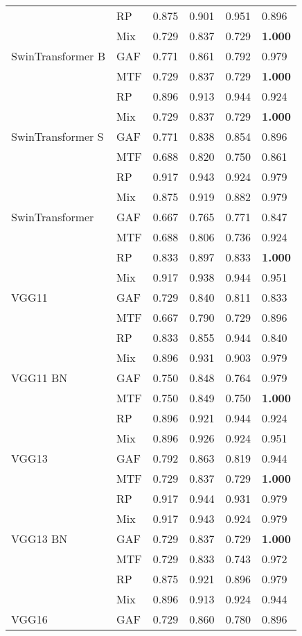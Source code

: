\begin{longtable}[t]{llllll}
 & RP & 0.875 & 0.901 & 0.951 & 0.896 \\
 & Mix & 0.729 & 0.837 & 0.729 & \textbf{1.000} \\
SwinTransformer B & GAF & 0.771 & 0.861 & 0.792 & 0.979 \\
 & MTF & 0.729 & 0.837 & 0.729 & \textbf{1.000} \\
 & RP & 0.896 & 0.913 & 0.944 & 0.924 \\
 & Mix & 0.729 & 0.837 & 0.729 & \textbf{1.000} \\
SwinTransformer S & GAF & 0.771 & 0.838 & 0.854 & 0.896 \\
 & MTF & 0.688 & 0.820 & 0.750 & 0.861 \\
 & RP & 0.917 & 0.943 & 0.924 & 0.979 \\
 & Mix & 0.875 & 0.919 & 0.882 & 0.979 \\
SwinTransformer & GAF & 0.667 & 0.765 & 0.771 & 0.847 \\
 & MTF & 0.688 & 0.806 & 0.736 & 0.924 \\
 & RP & 0.833 & 0.897 & 0.833 & \textbf{1.000} \\
 & Mix & 0.917 & 0.938 & 0.944 & 0.951 \\
VGG11 & GAF & 0.729 & 0.840 & 0.811 & 0.833 \\
 & MTF & 0.667 & 0.790 & 0.729 & 0.896 \\
 & RP & 0.833 & 0.855 & 0.944 & 0.840 \\
 & Mix & 0.896 & 0.931 & 0.903 & 0.979 \\
VGG11 BN & GAF & 0.750 & 0.848 & 0.764 & 0.979 \\
 & MTF & 0.750 & 0.849 & 0.750 & \textbf{1.000} \\
 & RP & 0.896 & 0.921 & 0.944 & 0.924 \\
 & Mix & 0.896 & 0.926 & 0.924 & 0.951 \\
VGG13 & GAF & 0.792 & 0.863 & 0.819 & 0.944 \\
 & MTF & 0.729 & 0.837 & 0.729 & \textbf{1.000} \\
 & RP & 0.917 & 0.944 & 0.931 & 0.979 \\
 & Mix & 0.917 & 0.943 & 0.924 & 0.979 \\
VGG13 BN & GAF & 0.729 & 0.837 & 0.729 & \textbf{1.000} \\
 & MTF & 0.729 & 0.833 & 0.743 & 0.972 \\
 & RP & 0.875 & 0.921 & 0.896 & 0.979 \\
 & Mix & 0.896 & 0.913 & 0.924 & 0.944 \\
VGG16 & GAF & 0.729 & 0.860 & 0.780 & 0.896 \\

\end{longtable}
